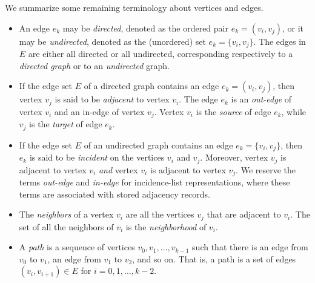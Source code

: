 We summarize some remaining terminology about vertices and edges.
\begin{itemize}
\item 
An edge $e_k$ may be \emph{directed}, denoted as the ordered pair $e_k=(v_i, v_j)$, or it may be
  \emph{undirected}, denoted as the (unordered) set $e_k=\{v_i, v_j\}$.  The edges 
in $E$ are either all directed or all undirected,
  corresponding respectively to a \emph{directed graph} or to an \emph{undirected} graph.
\item 
If the edge set $E$ of a directed graph contains an edge $e_k = (v_i,v_j)$, then
  vertex $v_j$ is said to be \emph{adjacent} to vertex $v_i$.  The edge $e_k$ is an
  \emph{out-edge} of vertex $v_i$ and an in-edge of vertex $v_j$.  Vertex $v_i$ is the \emph{source} of
  edge $e_k$, while $v_j$ is the \emph{target} of edge $e_k$.
\item If the edge set $E$ of an undirected graph contains an edge $e_k = \{v_i,v_j\}$, then
  $e_k$ is said to be \emph{incident} on the vertices $v_i$ and $v_j$.
  Moreover, vertex $v_j$ is adjacent to vertex $v_i$
  \emph{and} vertex $v_i$ is adjacent to vertex $v_j$.
  We reserve the terms \emph{out-edge} and \emph{in-edge} for incidence-list representations,
  where these terms are associated with stored adjacency records.
\item The \emph{neighbors} of a vertex $v_i$ are all the vertices $v_j$ that are adjacent to $v_i$.  The set of all the neighbors of $v_i$ is the \emph{neighborhood} of $v_i$.
\item A \emph{path} is a sequence of vertices $v_0, v_1, \ldots, v_{k-1}$ such that
there is an edge from $v_0$ to $v_1$, an edge from $v_1$ to $v_2$, and so on.
That is, a path is a set of edges $(v_i, v_{i+1}) \in E$ for  $i = 0, 1, \ldots, k-2$.
\end{itemize}



